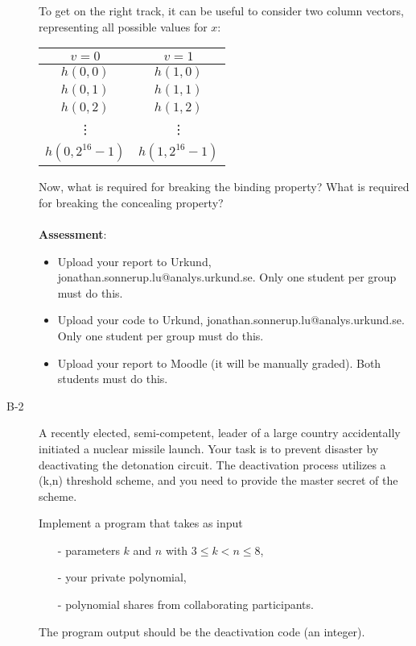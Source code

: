 \documentclass{article}
\begin{document}
\begin{description}
{\begin{itemize}
		\end{itemize}
		To get on the right track, it can be useful to consider two column vectors, representing all possible values for $x$:	
		\begin{center}
		\begin{tabular}{c|c}
			$v=0$ & $v=1$ \\\hline
			$h(0,0)$ & $h(1,0)$ \\
			$h(0,1)$ & $h(1,1)$ \\
			$h(0,2)$ & $h(1,2)$ \\
			\vdots & \vdots \\
			$h(0,2^{16}-1)$ & $h(1,2^{16}-1)$ \\
		\end{tabular}
		\end{center}
		Now, what is required for breaking the binding property? What is required for breaking the concealing property?\\\\
		
		\textbf{Assessment}:
		\begin{itemize}
			\item Upload your report to Urkund, jonathan.sonnerup.lu@analys.urkund.se. 
			Only one student per group must do this.
			\item Upload your code to Urkund, jonathan.sonnerup.lu@analys.urkund.se. Only one student per group must do this.
			\item Upload your report to Moodle (it will be manually graded). Both students must do this.
		\end{itemize}}
		
		
		\item[B-2]{A recently elected, semi-competent, leader of a large country accidentally initiated a nuclear missile launch. Your task is to prevent disaster by deactivating the detonation circuit. The deactivation process
			utilizes a (k,n) threshold scheme, and you need to provide the master secret of the scheme.
			
			Implement a program that takes as input
			\begin{itemize}
				\item[-] parameters $k$ and $n$ with $3\leq k<n\leq 8$,
				\item[-] your private polynomial,
				\item[-] polynomial shares from collaborating participants.
			\end{itemize}
			The program output should be the deactivation code (an integer).
			
}
\end{description}
\end{document}
